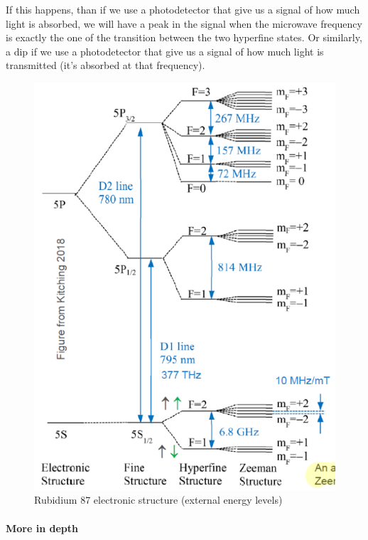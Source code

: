 If this happens, than if we use a photodetector that give us a signal of how much light is absorbed, we will have a peak in the signal when the microwave frequency is exactly the one of the transition between the two hyperfine states.
Or similarly, a dip if we use a photodetector that give us a signal of how much light is transmitted (it's absorbed at that frequency).

\begin{figure}[H]
    \centering
    \includegraphics[width=\linewidth]{img/02.1-rubidium-electronic-structure}
    \caption{Rubidium 87 electronic structure (external energy levels)}
    \label{fig:rubidium-electronic-structure}
\end{figure}

\paragraph{More in depth}

